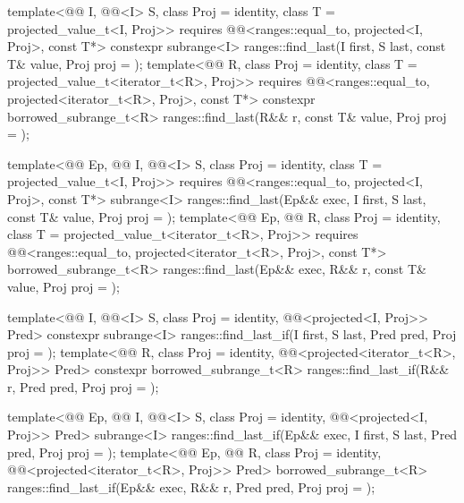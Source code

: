 %
\begin{itemdecl}
template<@@ I, @@<I> S, class Proj = identity,
         class T = projected_value_t<I, Proj>>
  requires @@<ranges::equal_to, projected<I, Proj>, const T*>
  constexpr subrange<I> ranges::find_last(I first, S last, const T& value, Proj proj = {});
template<@@ R, class Proj = identity,
         class T = projected_value_t<iterator_t<R>, Proj>>
  requires @@<ranges::equal_to, projected<iterator_t<R>, Proj>, const T*>
  constexpr borrowed_subrange_t<R> ranges::find_last(R&& r, const T& value, Proj proj = {});

template<@@ Ep, @@ I, @@<I> S,
         class Proj = identity, class T = projected_value_t<I, Proj>>
  requires @@<ranges::equal_to, projected<I, Proj>, const T*>
  subrange<I> ranges::find_last(Ep&& exec, I first, S last, const T& value, Proj proj = {});
template<@@ Ep, @@ R, class Proj = identity,
          class T = projected_value_t<iterator_t<R>, Proj>>
  requires
    @@<ranges::equal_to, projected<iterator_t<R>, Proj>, const T*>
  borrowed_subrange_t<R> ranges::find_last(Ep&& exec, R&& r, const T& value, Proj proj = {});

template<@@ I, @@<I> S, class Proj = identity,
         @@<projected<I, Proj>> Pred>
  constexpr subrange<I> ranges::find_last_if(I first, S last, Pred pred, Proj proj = {});
template<@@ R, class Proj = identity,
         @@<projected<iterator_t<R>, Proj>> Pred>
  constexpr borrowed_subrange_t<R> ranges::find_last_if(R&& r, Pred pred, Proj proj = {});

template<@@ Ep, @@ I, @@<I> S,
         class Proj = identity, @@<projected<I, Proj>> Pred>
  subrange<I> ranges::find_last_if(Ep&& exec, I first, S last, Pred pred, Proj proj = {});
template<@@ Ep, @@ R,
          class Proj = identity,
          @@<projected<iterator_t<R>, Proj>> Pred>
  borrowed_subrange_t<R> ranges::find_last_if(Ep&& exec, R&& r, Pred pred, Proj proj = {});


\end{itemdecl}
